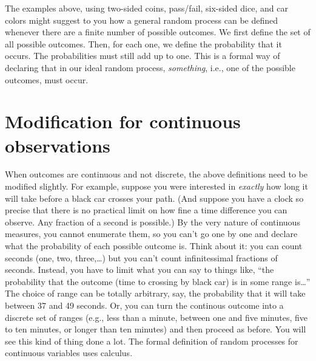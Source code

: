 \documentclass[
  openany]{book}
\begin{document}
The examples above, using two-sided coins, pass/fail, six-sided dice, and car colors might suggest to you how a general random process can be defined whenever there are a finite number of possible outcomes. We first define the set of all possible outcomes. Then, for each one, we define the probability that it occurs. The probabilities must still add up to one. This is a formal way of declaring that in our ideal random process, \emph{something}, i.e., one of the possible outcomes, must occur.

\hypertarget{modification-for-continuous-observations}{%
\section{Modification for continuous observations}\label{modification-for-continuous-observations}}

When outcomes are continuous and not discrete, the above definitions need to be modified slightly. For example, suppose you were interested in \emph{exactly} how long it will take before a black car crosses your path. (And suppose you have a clock so precise that there is no practical limit on how fine a time difference you can observe. Any fraction of a second is possible.) By the very nature of continuous measures, you cannot enumerate them, so you can't go one by one and declare what the probability of each possible outcome is. Think about it: you can count seconds (one, two, three,\ldots) but you can't count infinitessimal fractions of seconds. Instead, you have to limit what you can say to things like, ``the probability that the outcome (time to crossing by black car) is in some range is\ldots{}'' The choice of range can be totally arbitrary, say, the probability that it will take between 37 and 49 seconds. Or, you can turn the continous outcome into a discrete set of ranges (e.g., less than a minute, between one and five minutes, five to ten minutes, or longer than ten minutes) and then proceed as before. You will see this kind of thing done a lot. The formal definition of random processes for continuous variables uses calculus.

  
\end{document}
